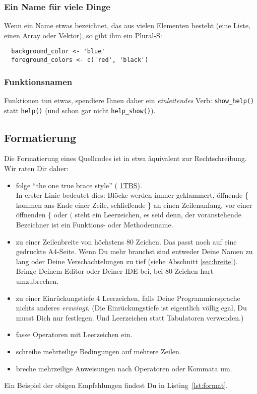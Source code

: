 \documentclass[twoside]{scrartcl}
\providecommand{\code}[1]{\texttt{#1}}
\begin{document}
\subsubsection{Ein Name f\"u{}r viele Dinge}
Wenn ein Name etwas bezeichnet, das aus vielen Elementen besteht (eine Liste,
einen Array oder Vektor), so gibt ihm ein Plural-S:
\begin{lstlisting}
  background_color <- 'blue'
  foreground_colors <- c('red', 'black')
\end{lstlisting}

\subsubsection{Funktionsnamen}
Funktionen tun etwas, spendiere Ihnen daher ein \emph{einleitendes} Verb:
\code{show\_help()} statt \code{help()} (und schon gar nicht  
\code{help\_show()}).

\subsection{Formatierung\label{sec:format}}
Die Formatierung eines Quellcodes ist in etwa \"a{}quivalent zur
Rechtschreibung. Wir raten Dir daher:
\begin{itemize}
\item folge "`the one true brace style"' (%
\href{http://en.wikipedia.org/wiki/Indent_style#Variant:_1TBS}{1TBS}).\\
  In erster Linie bedeutet dies: Bl\"o{}cke werden immer geklammert,
  \"o{}ffnende \{ kommen ans Ende einer
  Zeile, schlie\ss{}ende \} an einen Zeilenanfang, vor einer
  \"o{}ffnenden \{ oder $($ steht ein Leerzeichen, es seid denn,
  der voranstehende Bezeichner ist ein Funktions- oder Methodenname.
\item zu einer Zeilenbreite von h\"o{}chstens 80 Zeichen. Das passt
  noch auf eine gedruckte A4-Seite. Wenn Du mehr brauchst sind
  entweder Deine Namen zu lang oder Deine Verschachtelungen zu
  tief (siehe Abschnitt \ref{sec:breite}).
  Bringe Deinem Editor oder Deiner IDE bei, bei 80 Zeichen hart
  umzubrechen.
\item zu einer Einr\"u{}ckungstiefe 4 Leerzeichen, falls Deine
  Programmiersprache nichts anderes \emph{erzwingt}.
  (Die Einr\"u{}ckungstiefe ist eigentlich v\"o{}llig egal, Du
  musst Dich nur festlegen. Und Leerzeichen statt
  Tabulatoren verwenden.)
\item fasse Operatoren mit Leerzeichen ein.
\item schreibe mehrteilige Bedingungen auf mehrere Zeilen.
\item breche mehrzeilige Anweisungen nach Operatoren oder Kommata
  um.
\end{itemize}
Ein Beispiel der obigen Empfehlungen 
findest Du in Listing~\ref{lst:format}.

\end{document}
